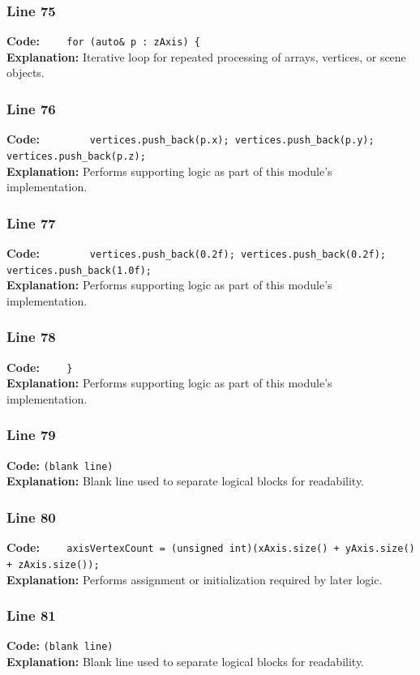 \documentclass[11pt,a4paper]{article}
\begin{document}
\subsubsection*{Line 75}
\textbf{Code:} \verb|    for (auto& p : zAxis) {|\\
\textbf{Explanation:} Iterative loop for repeated processing of arrays, vertices, or scene objects.

\subsubsection*{Line 76}
\textbf{Code:} \verb|        vertices.push_back(p.x); vertices.push_back(p.y); vertices.push_back(p.z);|\\
\textbf{Explanation:} Performs supporting logic as part of this module's implementation.

\subsubsection*{Line 77}
\textbf{Code:} \verb|        vertices.push_back(0.2f); vertices.push_back(0.2f); vertices.push_back(1.0f);|\\
\textbf{Explanation:} Performs supporting logic as part of this module's implementation.

\subsubsection*{Line 78}
\textbf{Code:} \verb|    }|\\
\textbf{Explanation:} Performs supporting logic as part of this module's implementation.

\subsubsection*{Line 79}
\textbf{Code:} \texttt{(blank line)}\\
\textbf{Explanation:} Blank line used to separate logical blocks for readability.

\subsubsection*{Line 80}
\textbf{Code:} \verb|    axisVertexCount = (unsigned int)(xAxis.size() + yAxis.size() + zAxis.size());|\\
\textbf{Explanation:} Performs assignment or initialization required by later logic.

\subsubsection*{Line 81}
\textbf{Code:} \texttt{(blank line)}\\
\textbf{Explanation:} Blank line used to separate logical blocks for readability.
\end{document}
